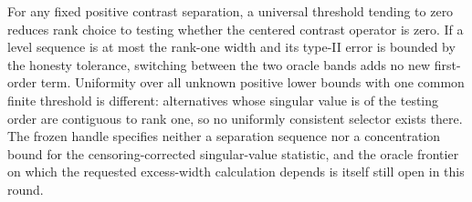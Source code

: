 For any fixed positive contrast separation, a universal threshold tending to zero reduces rank choice to testing whether the centered contrast operator is zero.  If a level sequence is at most the rank-one width and its type-II error is bounded by the honesty tolerance, switching between the two oracle bands adds no new first-order term.  Uniformity over all unknown positive lower bounds with one common finite threshold is different: alternatives whose singular value is of the testing order are contiguous to rank one, so no uniformly consistent selector exists there.  The frozen handle specifies neither a separation sequence nor a concentration bound for the censoring-corrected singular-value statistic, and the oracle frontier on which the requested excess-width calculation depends is itself still open in this round.